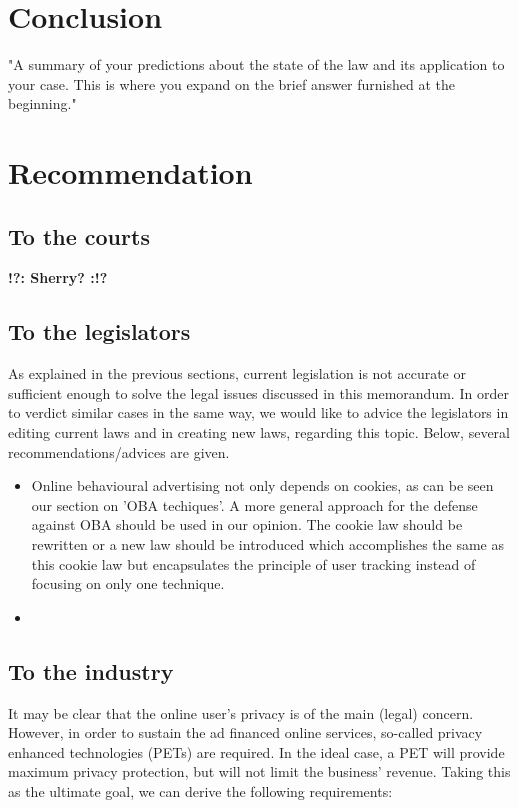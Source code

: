 \documentclass[11pt]{article}
\newcommand{\tocheck}[1]{{\bf !?: #1 :!?}}
\begin{document}
\section{Conclusion}
"A summary of your predictions about the state of the law and its application to your case.
This is where you expand on the brief answer furnished at the beginning."



\section{Recommendation}
\subsection{To the courts}
\tocheck{Sherry?}
\subsection{To the legislators}
As explained in the previous sections, current legislation is not accurate or sufficient enough to solve the legal issues discussed in this memorandum. In order to verdict similar cases in the same way, we would like to advice the legislators in editing current laws and in creating new laws, regarding this topic. Below, several recommendations/advices are given.


\begin{itemize}
	\item Online behavioural advertising not only depends on cookies, as can be seen our section on 'OBA techiques'. A more general approach for the defense against OBA should be used in our opinion. The cookie law \cite{cookie dinges cite wheet ik veel hoe die heet?} should be rewritten or a new law should be introduced which accomplishes the same as this cookie law but encapsulates the principle of user tracking instead of focusing on only one technique.
	\item 
\end{itemize}

\subsection{To the industry}
It may be clear that the online user's privacy is of the main (legal) concern. However, in order to sustain the ad financed online services, so-called privacy enhanced technologies (PETs) are required. In the ideal case, a PET will provide maximum privacy protection, but will not limit the business' revenue. Taking this as the ultimate goal, we can derive the following requirements:
\end{document}
